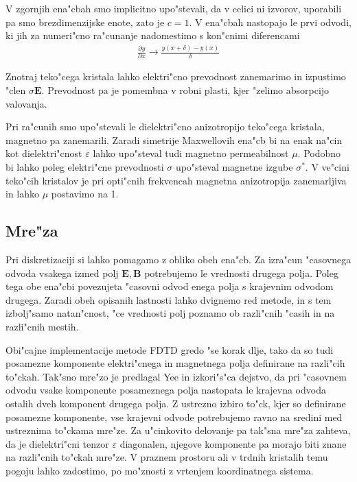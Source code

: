 \documentclass[a4paper,10pt]{article}
\renewcommand{\vec}{\mathbf}
\newcommand{\eps}{\varepsilon}
\begin{document}
V zgornjih ena"cbah smo implicitno upo"stevali, da v celici ni izvorov, uporabili pa smo brezdimenzijske enote, zato je $c=1$.
V ena"cbah nastopajo le prvi odvodi, ki jih za numeri"cno ra"cunanje nadomestimo s kon"cnimi diferencami
\begin{align}
 \frac{\partial y}{\partial x} \rightarrow \frac{y(x+\delta) - y(x)}{\delta}
\end{align}

Znotraj teko"cega kristala lahko elektri"cno prevodnost zanemarimo in izpustimo "clen $\sigma \vec E$. 
Prevodnost pa je pomembna v robni plasti, kjer "zelimo absorpcijo valovanja. 

Pri ra"cunih smo upo"stevali le dielektri"cno anizotropijo teko"cega kristala, magnetno pa zanemarili. 
Zaradi simetrije Maxwellovih ena"cb bi na enak na"cin kot dielektri"cnost $\varepsilon$ lahko upo"steval tudi magnetno permeabilnost $\mu$. 
Podobno bi lahko poleg elektri"cne prevodnosti $\sigma$ upo"steval magnetne izgube $\sigma^*$. 
V ve"cini teko"cih kristalov je pri opti"cnih frekvencah magnetna anizotropija zanemarljiva in lahko $\mu$ postavimo na 1. 

\subsection{Mre"za}

Pri diskretizaciji si lahko pomagamo z obliko obeh ena"cb. 
Za izra"cun "casovnega odvoda vsakega izmed polj $\vec{E}, \vec{B}$ potrebujemo le vrednosti drugega polja. 
Poleg tega obe ena"cbi povezujeta "casovni odvod enega polja s krajevnim odvodom drugega. 
Zaradi obeh opisanih lastnosti lahko dvignemo red metode, in s tem izbolj"samo natan"cnost, "ce vrednosti polj poznamo ob razli"cnih "casih in na razli"cnih mestih\cite{taflove}. 

Obi"cajne implementacije metode \acs{FDTD} gredo "se korak dlje, tako da so tudi posamezne komponente elektri"cnega in magnetnega polja definirane na razli"cih to"ckah\cite{yee, yee-lattice}.
Tak"sno mre"zo je predlagal Yee in izkori"s"ca dejstvo, da pri "casovnem odvodu vsake komponente posameznega polja nastopata le krajevna odvoda ostalih dveh komponent drugega polja. 
Z ustrezno izbiro to"ck, kjer so definirane posamezne komponente, vse krajevni odvode potrebujemo ravno na sredini med ustreznima to"ckama mre"ze. 
Za u"cinkovito delovanje pa tak"sna mre"za zahteva, da je dielektri"cni tenzor $\eps$ diagonalen, njegove komponente pa morajo biti znane na razli"cnih to"ckah mre"ze. 
V praznem prostoru ali v trdnih kristalih temu pogoju lahko zadostimo, po mo"znosti z vrtenjem koordinatnega sistema.
\end{document}
